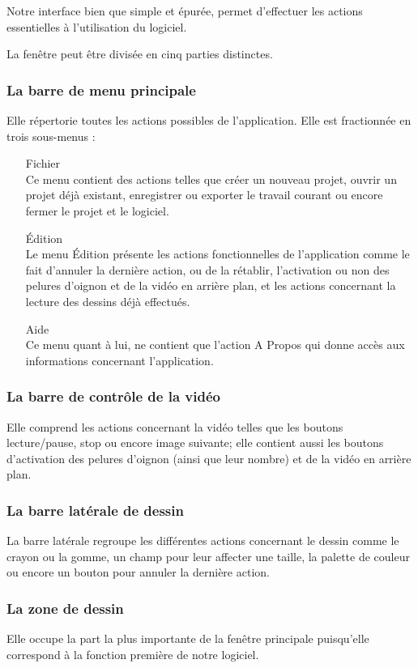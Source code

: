 	Notre interface bien que simple et épurée, permet d'effectuer les actions essentielles à l'utilisation du logiciel.
	
	La fenêtre peut être divisée en cinq parties distinctes.
	\subsubsection{La barre de menu principale}
	Elle répertorie toutes les actions possibles de l'application. Elle est fractionnée en trois sous-menus :
	\begin{itemize}
		\item[Fichier] \hfill \\
			Ce menu contient des actions telles que créer un nouveau projet, ouvrir un projet déjà existant, enregistrer ou exporter le travail courant ou encore fermer le projet et le logiciel.
		\item[\'Edition] \hfill \\
			Le menu \'Edition présente les actions fonctionnelles de l'application comme le fait d'annuler la dernière action, ou de la rétablir, l'activation ou non des pelures d'oignon et de la vidéo en arrière plan, et les actions concernant la lecture des dessins déjà effectués.
		\item[Aide] \hfill \\
			Ce menu quant à lui, ne contient que l'action A Propos qui donne accès aux informations concernant l'application.
	\end{itemize}
	
	\subsubsection{La barre de contrôle de la vidéo}
		Elle comprend les actions concernant la vidéo telles que les boutons lecture/pause, stop ou encore image suivante; elle contient aussi les boutons d'activation des pelures d'oignon (ainsi que leur nombre) et de la vidéo en arrière plan.
	
	\subsubsection{La barre latérale de dessin}
		La barre latérale regroupe les différentes actions concernant le dessin comme le crayon ou la gomme, un champ pour leur affecter une taille, la palette de couleur ou encore un bouton pour annuler la dernière action.
	
	\subsubsection{La zone de dessin}
		Elle occupe la part la plus importante de la fenêtre principale puisqu'elle correspond à la fonction première de notre logiciel.
	
